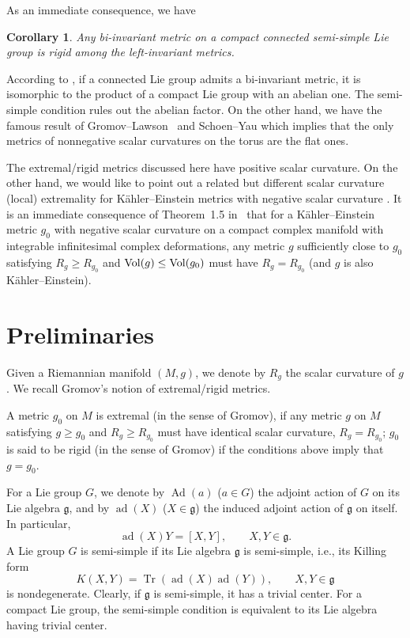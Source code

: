 \documentclass[pdftex]{sigma}
\newtheorem{Corollary}[Theorem]{Corollary}
\begin{document}
As an immediate consequence, we have
\begin{Corollary}\label{corollary1}
	Any bi-invariant metric on a compact connected semi-simple Lie group is rigid among the left-invariant metrics.
\end{Corollary}

According to \cite{1}, if a connected Lie group admits a bi-invariant metric, it is isomorphic to the product of a compact Lie group with an abelian one. The semi-simple condition rules out the abelian factor. On the other hand, we have the famous result of Gromov--Lawson~\cite{9} and Schoen--Yau \cite{10, 11} which implies that the only metrics of nonnegative scalar curvatures on the torus are the flat ones.
\begin{Remark}
 The extremal/rigid metrics discussed here have positive scalar curvature. On the other hand, we would like to point out a related but different scalar curvature (local) extremality for K\"ahler--Einstein metrics with negative scalar curvature \cite{15}. It is an immediate consequence of Theorem~1.5 in~\cite{15} that for a K\"ahler--Einstein metric $g_0$ with negative scalar curvature on a compact complex manifold with integrable infinitesimal complex deformations, any metric $g$ sufficiently close to $g_0$ satisfying $R_g\geq R_{g_0}$ and ${\rm Vol}(g) \leq {\rm Vol}(g_0)$ must have $R_g = R_{g_0}$ (and $g$ is also K\"ahler--Einstein).
\end{Remark}

\section{Preliminaries}

Given a Riemannian manifold $(M,g)$, we denote by $R_g$ the scalar curvature of $g$.
We recall Gromov's notion of extremal/rigid metrics.
\begin{Definition}
	A metric $g_0$ on $M$ is extremal (in the sense of Gromov), if any metric $g$ on $M$ satisfying $g\geq g_0$ and $R_{g}\geq R_{g_0}$ must have identical scalar curvature, $R_g=R_{g_0}$; $g_0$ is said to be rigid (in the sense of Gromov) if the conditions above imply that $g=g_0$.
\end{Definition}

For a Lie group $G$, we denote by $\operatorname{Ad}(a)$ ($a\in G$) the adjoint action of $G$ on its Lie algebra $\mathfrak{g}$, and by $\operatorname{ad}(X)$ ($X\in \mathfrak{g}$) the induced adjoint action of $\mathfrak{g}$ on itself. In particular,
\[
\operatorname{ad}(X)Y=[X, Y], \qquad X, Y \in \mathfrak{g}.
\]
A Lie group $G$ is semi-simple if its Lie algebra $\mathfrak{g}$ is semi-simple, i.e., its Killing form
\[
K(X, Y) = {\operatorname{Tr}}(\operatorname{ad}(X) \operatorname{ad}(Y)), \qquad X, Y \in \mathfrak{g}
\]
is nondegenerate. Clearly, if $\mathfrak{g}$ is semi-simple, it has a trivial center. For a compact Lie group, the semi-simple condition is equivalent to its Lie algebra having trivial center.
\end{document}
